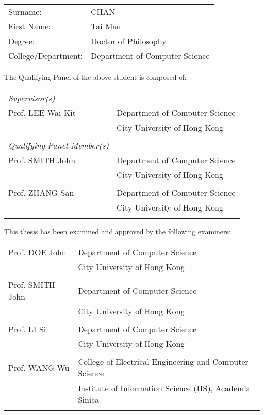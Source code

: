\begin{panel}

\begin{tabular}{p{50mm}p{70mm}}
Surname: & CHAN\tabularnewline
First Name: & Tai Man\tabularnewline
Degree: & Doctor of Philosophy\tabularnewline
College/Department: & Department of Computer Science
\end{tabular}

\vspace{2em}

The Qualifying Panel of the above student is composed of:

\vspace{1em}

\begin{tabular}{p{50mm}p{90mm}}
\textit{Supervisor(s)} & \tabularnewline
Prof. LEE Wai Kit 	 & Department of Computer Science\tabularnewline
 & City University of Hong Kong\\[1em]\tabularnewline

 
\textit{Qualifying Panel Member(s)} & \tabularnewline
Prof. SMITH John 	 & Department of Computer Science\tabularnewline
 & City University of Hong Kong\\[.2em]\tabularnewline

Prof. ZHANG San 	 & Department of Computer Science\tabularnewline
 & City University of Hong Kong\\[.2em]\tabularnewline
\end{tabular}

\vspace{2em}

This thesis has been examined and approved by the following examiners:
\vspace{1em}

\begin{tabular}{p{50mm}p{90mm}}
Prof. DOE John 	 & Department of Computer Science\tabularnewline
 & City University of Hong Kong\\[.2em]\tabularnewline

Prof. SMITH John 	 & Department of Computer Science\tabularnewline
 & City University of Hong Kong\\[.2em]\tabularnewline

Prof. LI Si  & Department of Computer Science\tabularnewline
 & City University of Hong Kong\\[.2em]\tabularnewline

Prof. WANG Wu  & College of Electrical Engineering and Computer Science\tabularnewline
 & Institute of Information Science (IIS), Academia Sinica \\[.2em]\tabularnewline
\end{tabular}

\end{panel}
